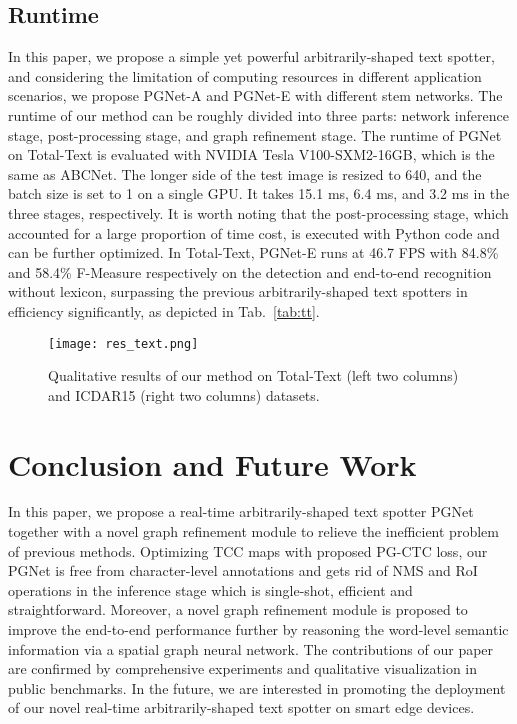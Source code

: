 \documentclass[letterpaper]{article} \usepackage{aaai21}  \usepackage{times}  \usepackage{helvet} \usepackage{courier}  \usepackage[hyphens]{url}  \usepackage{graphicx} \urlstyle{rm} \def\UrlFont{\rm}  \usepackage{natbib}  \usepackage{caption} \usepackage{bm}
\begin{document}
\subsection{Runtime} 
In this paper, we propose a simple yet powerful arbitrarily-shaped text spotter, and considering the limitation of computing resources in different application scenarios, we propose PGNet-A and PGNet-E with different stem networks. The runtime of our method can be roughly divided into three parts: network inference stage, post-processing stage, and graph refinement stage. The runtime of PGNet on Total-Text is evaluated with NVIDIA Tesla V100-SXM2-16GB, which is the same as ABCNet. The longer side of the test image is resized to 640, and the batch size is set to 1 on a single GPU. It takes 15.1 ms,  6.4 ms, and 3.2 ms in the three stages, respectively. It is worth noting that the post-processing stage, which accounted for a large proportion of time cost, is executed with Python code and can be further optimized. In Total-Text, PGNet-E runs at 46.7 FPS with  84.8\% and 58.4\% F-Measure respectively on the detection and end-to-end recognition without lexicon, surpassing the previous arbitrarily-shaped text spotters in efficiency significantly, as depicted in Tab.~\ref{tab:tt}.

\begin{figure*}
    \centering
    \texttt{[image: res\_text.png]}
    \caption{Qualitative results of our method on  Total-Text (left two columns) and ICDAR15 (right two columns) datasets.}
    \label{fig:res}
\end{figure*}



\section{Conclusion and Future Work}
In this paper, we propose a real-time arbitrarily-shaped text spotter PGNet together with a novel graph refinement module to relieve the inefficient problem of previous methods. Optimizing TCC maps with proposed PG-CTC loss, our PGNet is free from character-level annotations and gets rid of NMS and RoI operations in the inference stage which is single-shot, efficient and straightforward. Moreover, a novel graph refinement module is proposed to improve the end-to-end performance further by reasoning the word-level semantic information via a spatial graph neural network. The contributions of our paper are confirmed by comprehensive experiments and qualitative visualization in public benchmarks. In the future, we are interested in promoting the deployment of our novel real-time arbitrarily-shaped text spotter on  smart edge devices. 
\end{document}
